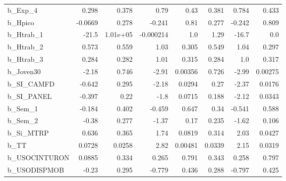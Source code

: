 \begin{tabular}{lrrrrrrr}
b\_Exp\_4       &   0.298 &    0.378 &      0.79 &     0.43 &         0.381 &        0.784 &         0.433 \\
b\_Hpico       & -0.0669 &    0.278 &    -0.241 &     0.81 &         0.277 &       -0.242 &         0.809 \\
b\_Htrab\_1     &   -21.5 & 1.01e+05 & -0.000214 &      1.0 &          1.29 &        -16.7 &           0.0 \\
b\_Htrab\_2     &   0.573 &    0.559 &      1.03 &    0.305 &         0.549 &         1.04 &         0.297 \\
b\_Htrab\_3     &   0.284 &    0.282 &      1.01 &    0.315 &         0.284 &          1.0 &         0.317 \\
b\_Joven30     &   -2.18 &    0.746 &     -2.91 &  0.00356 &         0.726 &        -2.99 &       0.00275 \\
b\_SI\_CAMFD    &  -0.642 &    0.295 &     -2.18 &   0.0294 &          0.27 &        -2.37 &        0.0176 \\
b\_SI\_PANEL    &  -0.397 &     0.22 &      -1.8 &   0.0715 &         0.188 &        -2.12 &        0.0343 \\
b\_Sem\_1       &  -0.184 &    0.402 &    -0.459 &    0.647 &          0.34 &       -0.541 &         0.588 \\
b\_Sem\_2       &   -0.38 &    0.277 &     -1.37 &     0.17 &         0.235 &        -1.62 &         0.106 \\
b\_Si\_MTRP     &   0.636 &    0.365 &      1.74 &   0.0819 &         0.314 &         2.03 &        0.0427 \\
b\_TT          &  0.0728 &   0.0258 &      2.82 &  0.00481 &        0.0339 &         2.15 &        0.0319 \\
b\_USOCINTURON &  0.0885 &    0.334 &     0.265 &    0.791 &         0.343 &        0.258 &         0.797 \\
b\_USODISPMOB  &   -0.23 &    0.295 &    -0.779 &    0.436 &         0.288 &       -0.797 &         0.425 \\
\bottomrule
\end{tabular}

